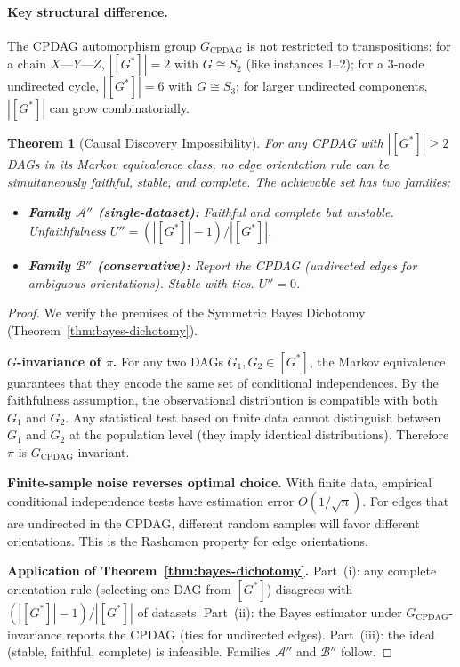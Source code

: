\documentclass{article}
\newtheorem{theorem}{Theorem}
\begin{document}
\paragraph{Key structural difference.}
The CPDAG automorphism group $G_{\text{CPDAG}}$ is not restricted to transpositions: for a chain $X\text{---}Y\text{---}Z$, $|[G^*]| = 2$ with $G \cong S_2$ (like instances 1--2); for a 3-node undirected cycle, $|[G^*]| = 6$ with $G \cong S_3$; for larger undirected components, $|[G^*]|$ can grow combinatorially.

\begin{theorem}[Causal Discovery Impossibility]
\label{thm:causal-discovery}
For any CPDAG with $|[G^*]| \geq 2$ DAGs in its Markov equivalence class, no edge orientation rule can be simultaneously faithful, stable, and complete.
The achievable set has two families:
\begin{itemize}
    \item \textbf{Family $\mathcal{A}''$ (single-dataset):} Faithful and complete but unstable. Unfaithfulness $U'' = (|[G^*]|-1)/|[G^*]|$.
    \item \textbf{Family $\mathcal{B}''$ (conservative):} Report the CPDAG (undirected edges for ambiguous orientations). Stable with ties. $U'' = 0$.
\end{itemize}
\end{theorem}

\begin{proof}
We verify the premises of the Symmetric Bayes Dichotomy (Theorem~\ref{thm:bayes-dichotomy}).

\textbf{$G$-invariance of $\pi$.} For any two DAGs $G_1, G_2 \in [G^*]$, the Markov equivalence guarantees that they encode the same set of conditional independences. By the faithfulness assumption, the observational distribution is compatible with both $G_1$ and $G_2$. Any statistical test based on finite data cannot distinguish between $G_1$ and $G_2$ at the population level (they imply identical distributions). Therefore $\pi$ is $G_{\text{CPDAG}}$-invariant.

\textbf{Finite-sample noise reverses optimal choice.} With finite data, empirical conditional independence tests have estimation error $O(1/\sqrt{n})$. For edges that are undirected in the CPDAG, different random samples will favor different orientations. This is the Rashomon property for edge orientations.

\textbf{Application of Theorem~\ref{thm:bayes-dichotomy}.} Part~(i): any complete orientation rule (selecting one DAG from $[G^*]$) disagrees with $(|[G^*]|-1)/|[G^*]|$ of datasets. Part~(ii): the Bayes estimator under $G_{\text{CPDAG}}$-invariance reports the CPDAG (ties for undirected edges). Part~(iii): the ideal (stable, faithful, complete) is infeasible. Families $\mathcal{A}''$ and $\mathcal{B}''$ follow.
\end{proof}
\end{document}
